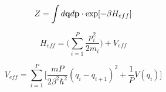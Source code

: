 \documentclass[12pt]{article}
\begin{document}
$$
  Z = \int d{\bf q} d{\bf p} \cdot \textrm{exp} [ -\beta H_{eff} ]
$$

$$
  H_{eff} = \bigg(\sum_{i=1}^P \frac{p_i^2}{2m_i}\bigg) + V_{eff}
$$

$$
  V_{eff} = \sum_{i=1}^P \bigg[ \frac{mP}{2\beta^2 \hbar^2} (q_i - q_{i+1})^2 + \frac{1}{P} V(q_i)\bigg]
$$
\end{document}
